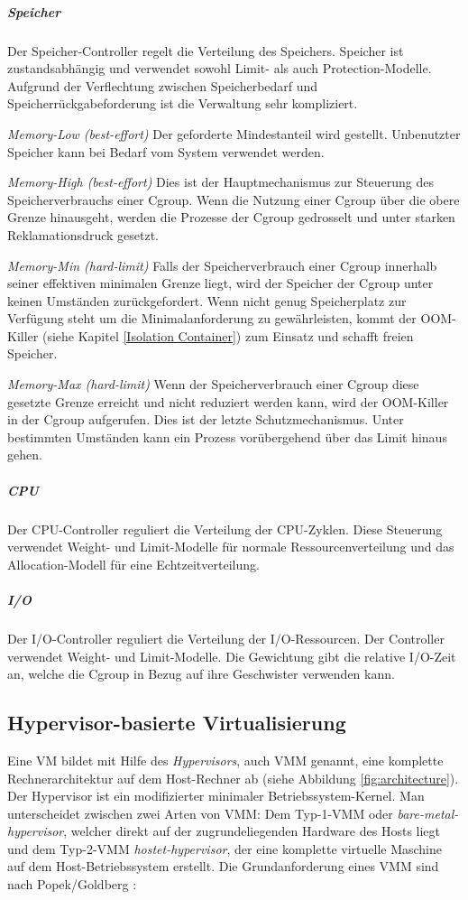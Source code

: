 \subparagraph{Speicher}
Der Speicher-Controller regelt die Verteilung des Speichers. Speicher ist zustandsabhängig und verwendet sowohl Limit- als auch Protection-Modelle. Aufgrund der Verflechtung zwischen Speicherbedarf und Speicherrückgabeforderung ist die Verwaltung sehr kompliziert.

\emph{Memory-Low (best-effort)}
Der geforderte Mindestanteil wird gestellt. Unbenutzter Speicher kann bei Bedarf vom System verwendet werden.

\emph{Memory-High (best-effort)}
Dies ist der Hauptmechanismus zur Steuerung des Speicherverbrauchs einer Cgroup. Wenn die Nutzung einer Cgroup über die obere Grenze hinausgeht, werden die Prozesse der Cgroup gedrosselt und unter starken Reklamationsdruck gesetzt.

\emph{Memory-Min (hard-limit)}
Falls der Speicherverbrauch einer Cgroup innerhalb seiner effektiven minimalen Grenze liegt, wird der Speicher der Cgroup unter keinen Umständen zurückgefordert. Wenn nicht genug Speicherplatz zur Verfügung steht um die Minimalanforderung zu gewährleisten, kommt der OOM-Killer (siehe Kapitel \ref{Isolation Container}) zum Einsatz und schafft freien Speicher.

\emph{Memory-Max (hard-limit)}
Wenn der Speicherverbrauch einer Cgroup diese gesetzte Grenze erreicht und nicht reduziert werden kann, wird der OOM-Killer in der Cgroup aufgerufen. Dies ist der letzte Schutzmechanismus. Unter bestimmten Umständen kann ein Prozess vorübergehend über das Limit hinaus gehen.

\subparagraph{CPU}
Der CPU-Controller reguliert die Verteilung der CPU-Zyklen. Diese Steuerung verwendet Weight- und Limit-Modelle für normale Ressourcenverteilung und das Allocation-Modell für eine Echtzeitverteilung.

\subparagraph{I/O}
Der I/O-Controller reguliert die Verteilung der I/O-Ressourcen. Der Controller verwendet Weight- und Limit-Modelle. Die Gewichtung gibt die relative I/O-Zeit an, welche die Cgroup in Bezug auf ihre Geschwister verwenden kann.

\subsection{Hypervisor-basierte Virtualisierung}
Eine \ac{VM} bildet mit Hilfe des \emph{Hypervisors}, auch \ac{VMM} genannt, eine komplette Rechnerarchitektur auf dem Host-Rechner ab (siehe Abbildung \ref{fig:architecture}). Der Hypervisor ist ein modifizierter minimaler Betriebssystem-Kernel. Man unterscheidet zwischen zwei Arten von VMM: Dem Typ-1-VMM oder \emph{bare-metal-hypervisor}, welcher direkt auf der zugrundeliegenden Hardware des Hosts liegt und dem Typ-2-VMM \emph{hostet-hypervisor}, der eine komplette virtuelle Maschine auf dem Host-Betriebssystem erstellt. Die Grundanforderung eines VMM sind nach Popek/Goldberg \cite{Popek1974FormalArchitectures,Glatz2015Betriebssysteme}:


